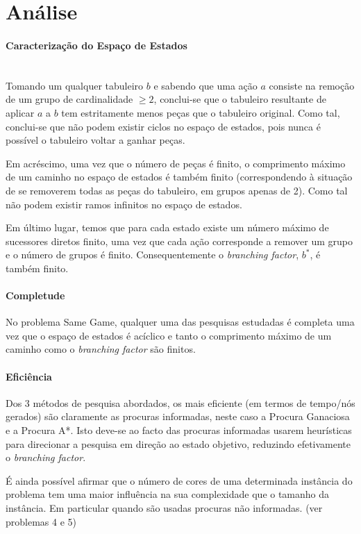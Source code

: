 \documentclass[a4paper]{article}
\begin{document}
    \section{Análise}
    \paragraph{Caracterização do Espaço de Estados}\mbox{} \\
    Tomando um qualquer tabuleiro $b$ e sabendo que uma ação $a$ consiste na remoção de um grupo de cardinalidade $\geq 2$,
    conclui-se que o tabuleiro resultante de aplicar $a$ a $b$ tem estritamente menos peças que o tabuleiro original. Como tal,
    conclui-se que não podem existir ciclos no espaço de estados, pois nunca é possível o tabuleiro voltar a ganhar peças.

    Em acréscimo, uma vez que o número de peças é finito, o comprimento máximo de um caminho no espaço de estados é também finito
    (correspondendo à situação de se removerem todas as peças do tabuleiro, em grupos apenas de 2). Como tal não podem existir
    ramos infinitos no espaço de estados.

    Em último lugar, temos que para cada estado existe um número máximo de sucessores diretos finito, uma vez que cada ação corresponde a
    remover um grupo e o número de grupos é finito. Consequentemente o \textit{branching factor}, $b^*$, é também finito.



    \paragraph{Completude}
    No problema Same Game, qualquer uma das pesquisas estudadas é completa uma vez que o espaço de estados é acíclico e tanto o
    comprimento máximo de um caminho como o \textit{branching factor} são finitos.


    \paragraph{Eficiência}
    Dos 3 métodos de pesquisa abordados, os mais eficiente (em termos de tempo/nós gerados) são claramente as procuras informadas,
    neste caso a Procura Ganaciosa e a Procura A*. Isto deve-se ao facto das procuras informadas usarem heurísticas para direcionar
    a pesquisa em direção ao estado objetivo, reduzindo efetivamente o \textit{branching factor}.

    É ainda possível afirmar que o número de cores de uma determinada instância do problema tem uma maior influência na
    sua complexidade que o tamanho da instância. Em particular quando são usadas procuras não informadas. (ver problemas 4 e 5)
\end{document}
